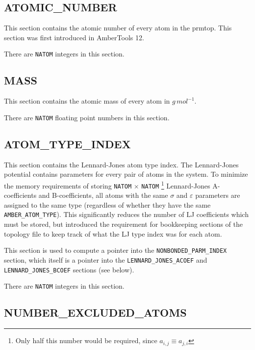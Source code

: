 \subsection*{ATOMIC\_NUMBER}

This section contains the atomic number of every atom in the prmtop. This
section was first introduced in AmberTools 12. \cite{AMBER12}


\noindent There are {\tt NATOM} integers in this section.

\subsection*{MASS}

This section contains the atomic mass of every atom in $g\, mol^{-1}$.


\noindent There are {\tt NATOM} floating point numbers in this section.

\subsection*{ATOM\_TYPE\_INDEX}

This section contains the Lennard-Jones atom type index. The Lennard-Jones
potential contains parameters for every pair of atoms in the system. To minimize
the memory requirements of storing {\tt NATOM} $\times$ {\tt NATOM}
\footnote{Only half this number would be required, since $a_{i,j} \equiv
a_{j,i}$} Lennard-Jones A-coefficients and B-coefficients, all atoms with the
same $\sigma$ and $\varepsilon$ parameters are assigned to the same type
(regardless of whether they have the same {\tt AMBER\_ATOM\_TYPE}). This
significantly reduces the number of LJ coefficients which must be stored, but
introduced the requirement for bookkeeping sections of the topology file to keep
track of what the LJ type index was for each atom.

This section is used to compute a pointer into the {\tt NONBONDED\_PARM\_INDEX}
section, which itself is a pointer into the {\tt LENNARD\_JONES\_ACOEF} and {\tt
LENNARD\_JONES\_BCOEF} sections (see below).


\noindent There are {\tt NATOM} integers in this section.

\subsection*{NUMBER\_EXCLUDED\_ATOMS}


